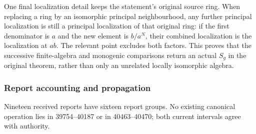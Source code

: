 One final localization detail keeps the statement's original source ring. When replacing a ring by an isomorphic principal neighbourhood, any further principal localization is still a principal localization of that original ring: if the first denominator is \(a\) and the new element is \(b/a^N\), their combined localization is the localization at \(ab\). The relevant point excludes both factors. This proves that the successive finite-algebra and monogenic comparisons return an actual \(S_g\) in the original theorem, rather than only an unrelated locally isomorphic algebra.

\subsubsection{Report accounting and propagation}\label{algebra-proof-052-report-accounting-and-propagation}

Nineteen received reports have sixteen report groups. No existing canonical operation lies in 39754--40187 or in 40463--40470; both current intervals agree with authority.

